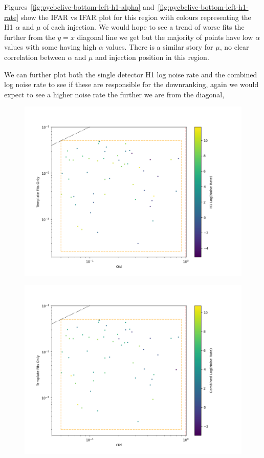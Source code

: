 %
Figures~\ref{fig:pycbclive-bottom-left-h1-alpha} and~\ref{fig:pycbclive-bottom-left-h1-rate} show the IFAR vs IFAR plot for this region with colours representing the H1 $\alpha$ and $\mu$ of each injection. We would hope to see a trend of worse fits the further from the $y=x$ diagonal line we get but the majority of points have low $\alpha$ values with some having high $\alpha$ values. There is a similar story for $\mu$, no clear correlation between $\alpha$ and $\mu$ and injection position in this region.

We can further plot both the single detector H1 log noise rate and the combined log noise rate to see if these are responsible for the downranking, again we would expect to see a higher noise rate the further we are from the diagonal,
%
\begin{figure}
    \centering  
    \includegraphics[width=1\textwidth]{images/5_pycbclive/bl_h1_lognoise.png}
    \caption{}
    \label{fig:pycbclive-bottom-left-h1-log-noise-rate}
\end{figure}
%
\begin{figure}
    \centering
    \includegraphics[width=1\textwidth]{images/5_pycbclive/bl_comb_lognoise.png}
    \caption{}
    \label{fig:pycbclive-bottom-left-comb-log-noise-rate}
\end{figure}
